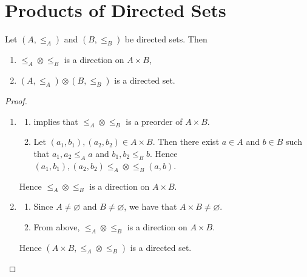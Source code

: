 \documentclass{book}
\begin{document}
	
	
	
	
	
	
	
	
	
	
	
	
	
	
	
	
	
	
	
	
	
	
	
	
	
	
	
	
	
	\newpage
	\section{Products of Directed Sets}
	
	\begin{ex} 
		Let $(A, \leq_A)$ and $(B, \leq_B)$ be directed sets. Then 
		\begin{enumerate}
			\item $\leq_A \otimes \leq_B$ is a direction on $A \times B$,
			\item $(A, \leq_A) \otimes (B, \leq_B)$ is a directed set.
		\end{enumerate}
	\end{ex}
	
	\begin{proof}\
		\begin{enumerate}
			\item 
			\begin{enumerate}
				\item {} implies that $\leq_A \otimes \leq_B$ is a preorder of $A \times B$.
				\item Let $(a_1, b_1), (a_2, b_2) \in A \times B$. Then there exist $a \in A$ and $b \in B$ such that $a_1, a_2 \leq_A a$ and $b_1, b_2 \leq_B b$. Hence $(a_1, b_1), (a_2, b_2) \leq_A \otimes \leq_B (a, b)$.
			\end{enumerate}
			Hence $\leq_A \otimes \leq_B$ is a direction on $A \times B$.
			\item 
			\begin{enumerate}
				\item Since $A \neq \varnothing$ and $B \neq \varnothing$, we have that $A \times B \neq \varnothing$.
				\item From above, $\leq_A \otimes \leq_B$ is a direction on $A \times B$. 
			\end{enumerate}
			Hence $(A \times B, \leq_A \otimes \leq_B)$ is a directed set.
		\end{enumerate}
	\end{proof}
	
\end{document}
